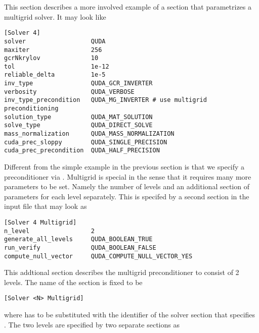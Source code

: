 This section describes a more involved example of a section that parametrizes a multigrid solver.
It may look like
\begin{verbatim}
[Solver 4]
solver                  QUDA
maxiter                 256
gcrNkrylov              10
tol                     1e-12
reliable_delta          1e-5
inv_type                QUDA_GCR_INVERTER
verbosity               QUDA_VERBOSE
inv_type_precondition   QUDA_MG_INVERTER # use multigrid preconditioning
solution_type           QUDA_MAT_SOLUTION
solve_type              QUDA_DIRECT_SOLVE
mass_normalization      QUDA_MASS_NORMALIZATION
cuda_prec_sloppy        QUDA_SINGLE_PRECISION
cuda_prec_precondition  QUDA_HALF_PRECISION
\end{verbatim}
Different from the simple example in the previous section is that we specify a preconditioner via .
Multigrid is special in the sense that it requires many more parameters to be set.
Namely the number of levels and an additional section of parameters for each level separately.
This is specifed by a second section in the input file that may look as
\begin{verbatim}
[Solver 4 Multigrid]
n_level                 2
generate_all_levels     QUDA_BOOLEAN_TRUE
run_verify              QUDA_BOOLEAN_FALSE
compute_null_vector     QUDA_COMPUTE_NULL_VECTOR_YES
\end{verbatim}
This addtional section describes the multigrid preconditioner to consist of 2 levels.
The name of the section is fixed to be
\begin{verbatim}
[Solver <N> Multigrid]
\end{verbatim}
where  has to be substituted with the identifier of the solver section that specifies .
The two levels are specified by two separate sections as
